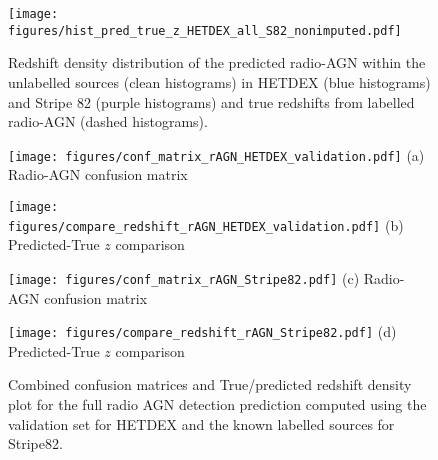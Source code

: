 \documentclass{aa}
\begin{document}
\begin{figure}
  \centering
    \texttt{[image: figures/hist\_pred\_true\_z\_HETDEX\_all\_S82\_nonimputed.pdf]}
  \caption{Redshift density distribution of the predicted radio-AGN within the unlabelled sources (clean histograms) in HETDEX (blue histograms) and Stripe 82 (purple histograms) and true redshifts from labelled radio-AGN (dashed histograms).}
  \label{fig:hist_pred_z_unlabel_true_z_label}
\end{figure}

\begin{figure*}
  \centering
  \begin{minipage}{0.20\textwidth}
    \centering
    \texttt{[image: figures/conf\_matrix\_rAGN\_HETDEX\_validation.pdf]}\hfill\break
    {(a) Radio-AGN confusion matrix}
  \end{minipage}%
      \centering
  \begin{minipage}{0.30\textwidth}
    \centering
    \texttt{[image: figures/compare\_redshift\_rAGN\_HETDEX\_validation.pdf]}\hfill\break
    {(b) Predicted-True $z$ comparison}
  \end{minipage}%
  \begin{minipage}{0.20\textwidth}
    \centering
    \texttt{[image: figures/conf\_matrix\_rAGN\_Stripe82.pdf]}\hfill\break
    {(c) Radio-AGN confusion matrix}
  \end{minipage}%
  \begin{minipage}{0.30\textwidth}
    \centering
    \texttt{[image: figures/compare\_redshift\_rAGN\_Stripe82.pdf]}\hfill\break
    {(d) Predicted-True $z$ comparison}
  \end{minipage}%
  \caption{Combined confusion matrices and True/predicted redshift density plot for the full radio AGN detection prediction computed using the validation set for HETDEX and the known labelled sources for Stripe82.
  }
  \label{fig:conf_matx_results_radio_AGN}
\end{figure*}
\end{document}
